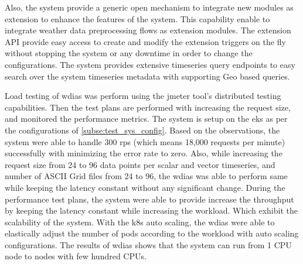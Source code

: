 Also, the system provide a generic open mechanism to integrate new modules as extension to enhance the features of the system. This capability enable to integrate weather data preprocessing flows as extension modules.
The extension API provide easy access to create and modify the extension triggers on the fly without stopping the system or any downtime in order to change the configurations.
The system provides extensive timeseries query endpoints to easy search over the system timeseries metadata with supporting Geo based queries.

Load testing of \acrshort{wdias} was perform using the \acrshort{jmeter} tool's distributed testing capabilities. Then the test plans are performed with increasing the request size, and monitored the performance metrics. The system is setup on the \acrfull{eks} as per the configurations of \ref{subse:test_sys_config}. Based on the observations, the system were able to handle 300 \acrshort{rps} (which means 18,000 requests per minute) successfully with minimizing the error rate to zero. Also, while increasing the request size from 24 to 96 data points per scalar and vector timeseries, and number of ASCII Grid files from 24 to 96, the \acrshort{wdias} was able to perform same while keeping the latency constant without any significant change. During the performance test plans, the system were able to provide increase the throughput by keeping the latency constant while increasing the workload. Which exhibit the scalability of the system.
With the \acrshort{k8s} auto scaling, the \acrshort{wdias} were able to elastically adjust the number of pods according to the workload with auto scaling configurations. 
The results of \acrshort{wdias} shows that the system can run from 1 CPU node to nodes with few hundred CPUs.